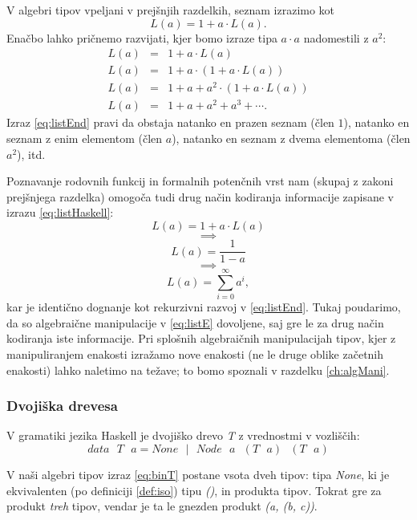 \documentclass[a4paper, 12pt]{book}
\begin{document}
V algebri tipov vpeljani v prejšnjih razdelkih, seznam izrazimo kot
$$L(a)=1+a\cdot L(a).$$
Enačbo lahko pričnemo razvijati, kjer bomo izraze tipa $a\cdot a$ nadomestili z $a^2$:
\begin{eqnarray}
L(a)&=& 1+a\cdot L(a)\label{eq:list}\nonumber \\
L(a)&=& 1+a\cdot(1+a\cdot L(a))\nonumber\\
L(a)&=& 1+a+a^2\cdot(1+a\cdot L(a))\nonumber\\
L(a)&=& 1+a+a^2+a^3+\cdots. \label{eq:listEnd}
\end{eqnarray}
Izraz \eqref{eq:listEnd} pravi da obstaja natanko en prazen seznam (člen $1$), natanko en seznam z enim elementom (člen $a$), natanko en seznam z dvema elementoma (člen $a^2$), itd.

Poznavanje rodovnih funkcij in formalnih potenčnih vrst nam (skupaj z zakoni prejšnjega razdelka) omogoča tudi drug način kodiranja informacije zapisane v izrazu \eqref{eq:listHaskell}:
$$L(a)=1+a\cdot L(a)$$
$$\implies$$
\begin{equation}
L(a)=\frac{1}{1-a}\label{eq:listE}
\end{equation}
$$\implies$$
$$L(a)=\sum\limits_{i=0}^\infty a^i,$$
kar je identično dognanje kot rekurzivni razvoj v \eqref{eq:listEnd}. Tukaj poudarimo, da so algebraične manipulacije v \eqref{eq:listE} dovoljene, saj gre le za drug način kodiranja iste informacije. Pri splošnih algebraičnih manipulacijah tipov, kjer z manipuliranjem enakosti izražamo nove enakosti (ne le druge oblike začetnih enakosti) lahko naletimo na težave; to bomo spoznali v razdelku \ref{ch:algMani}.

\subsubsection{Dvojiška drevesa}

V gramatiki jezika Haskell je dvojiško drevo \emph{T} z vrednostmi v vozliščih:
\begin{equation}\label{eq:binT}
data\text{ }T\text{ } a = None \text{ }|\text{ } Node\text{ } a\text{ } (T\text{ } a)\text{ }(T\text{ }a)
\end{equation}

V naši algebri tipov izraz \eqref{eq:binT} postane vsota dveh tipov: tipa \emph{None}, ki je ekvivalenten (po definiciji \ref{def:iso}) tipu \emph{()}, in produkta tipov. Tokrat gre za produkt \emph{treh} tipov, vendar je ta le gnezden produkt \emph{(a, (b, c))}.
\end{document}
